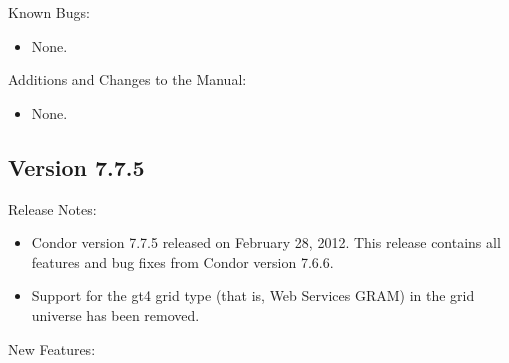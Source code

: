 \noindent Known Bugs:

\begin{itemize}

\item None.

\end{itemize}

\noindent Additions and Changes to the Manual:

\begin{itemize}

\item None.

\end{itemize}

\subsection*{\label{sec:New-7-7-5}Version 7.7.5}

\noindent Release Notes:

\begin{itemize}

\item Condor version 7.7.5 released on February 28, 2012.
This release contains all features and bug fixes from Condor version 7.6.6. 

\item Support for the gt4 grid type (that is, Web Services GRAM) in the grid
universe has been removed.

\end{itemize}


\noindent New Features:

